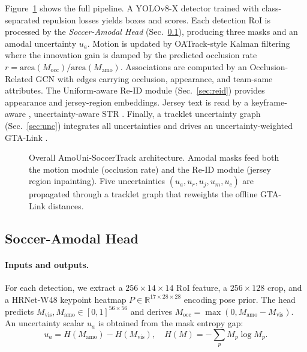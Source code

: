 \documentclass[conference]{IEEEtran}
\begin{document}
Figure~\ref{fig:arch} shows the full pipeline. A YOLOv8-X detector \cite{yolov8} trained with class-separated repulsion losses \cite{repulsionloss} yields boxes and scores. Each detection RoI is processed by the \emph{Soccer-Amodal Head} (Sec.~\ref{sec:amodal}), producing three masks and an amodal uncertainty $u_a$. Motion is updated by OATrack-style Kalman filtering \cite{oatrack} where the innovation gain is damped by the predicted occlusion rate $r = \text{area}(M_{\text{occ}})/\text{area}(M_{\text{amo}})$. Associations are computed by an Occlusion-Related GCN \cite{occgcn} with edges carrying occlusion, appearance, and team-same attributes. The Uniform-aware Re-ID module (Sec.~\ref{sec:reid}) provides appearance and jersey-region embeddings. Jersey text is read by a keyframe-aware \cite{keyframejersey}, uncertainty-aware STR \cite{uncertaintyjersey}. Finally, a tracklet uncertainty graph (Sec.~\ref{sec:unc}) integrates all uncertainties and drives an uncertainty-weighted GTA-Link \cite{gtatrack}.

\begin{figure}[t]
  \centering
  \caption{Overall AmoUni-SoccerTrack architecture. Amodal masks feed both the motion module (occlusion rate) and the Re-ID module (jersey region inpainting). Five uncertainties $(u_a, u_r, u_j, u_m, u_c)$ are propagated through a tracklet graph that reweights the offline GTA-Link distances.}
  \label{fig:arch}
\end{figure}

\subsection{Soccer-Amodal Head}
\label{sec:amodal}

\paragraph*{Inputs and outputs.}
For each detection, we extract a $256\times14\times14$ RoI feature, a $256\times128$ crop, and a HRNet-W48 keypoint heatmap $P\in\mathbb{R}^{17\times28\times28}$ encoding pose prior. The head predicts $M_{\text{vis}}, M_{\text{amo}}\in[0,1]^{56\times56}$ and derives $M_{\text{occ}}=\max(0, M_{\text{amo}}-M_{\text{vis}})$. An uncertainty scalar $u_a$ is obtained from the mask entropy gap:
\begin{equation}
u_a = H(M_{\text{amo}}) - H(M_{\text{vis}}),\quad H(M)=-\sum_p M_p\log M_p.
\end{equation}
\end{document}
